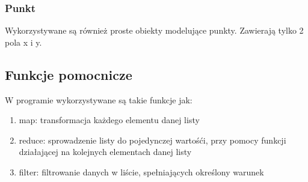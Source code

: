 \documentclass[12pt]{article}
\begin{document}
\subsubsection{Punkt}
Wykorzystywane są również proste obiekty modelujące punkty. Zawierają tylko 2 pola x i y.
\subsection{Funkcje pomocnicze}

W programie wykorzystywane są takie funkcje jak:
\begin{enumerate}
\item map: transformacja każdego elementu danej listy 
\item reduce: sprowadzenie listy do pojedynczej wartośći, przy pomocy funkcji działającej na kolejnych elementach danej listy 
\item filter: filtrowanie danych w liście, spełniających określony warunek
\end{enumerate}
\end{document}
